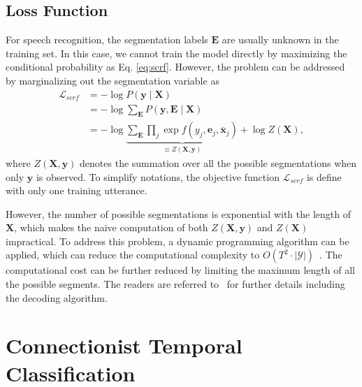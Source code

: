 \documentclass[a4paper]{article}
\begin{document}
\subsection{Loss Function}
\label{sec:hidden_loss}

For speech recognition, the segmentation labels ${\bm E}$ are usually unknown in the training set. In this case, we cannot train the model directly by maximizing the conditional probability as Eq. \eqref{eq:scrf}. However, the problem can be addressed by marginalizing out the segmentation variable as
\begin{align}
\mathcal{L}_{scrf} &= - \log P({\bm y} \mid {\bm X}) \nonumber \\
 &= - \log \sum_{{\bm E}} P({\bm y, \bm E} \mid {\bm X}) \nonumber \\
&= - \log \underbrace{\sum_{{\bm E}} \prod_j \exp f \left( y_j, {\bm e}_j, \bar{\bm x}_j \right)}_{\equiv Z({\bm X}, \mathbf{y})} + \log Z({\bm X}),
\end{align}
where $Z({\bm X}, {\bm y})$ denotes the summation over all the possible segmentations when only ${\bm y}$ is observed. To simplify notations, the objective function $\mathcal{L}_{scrf}$ is define with only one training utterance. 

However, the number of possible segmentations is exponential with the length of ${\bm X}$, which makes the naive computation of both $Z({\bm X}, {\bm y})$ and $Z({\bm X})$ impractical. To address this problem, a dynamic programming algorithm can be applied, which can reduce the computational complexity to $O(T^2\cdot |\mathcal{Y}|)$~\cite{sarawagi2004semi}. The computational cost can be further reduced by limiting the maximum length of all the possible segments. The readers are referred to~\cite{lu2016segmental} for further details including the decoding algorithm. 


\section{Connectionist Temporal Classification }
\end{document}
